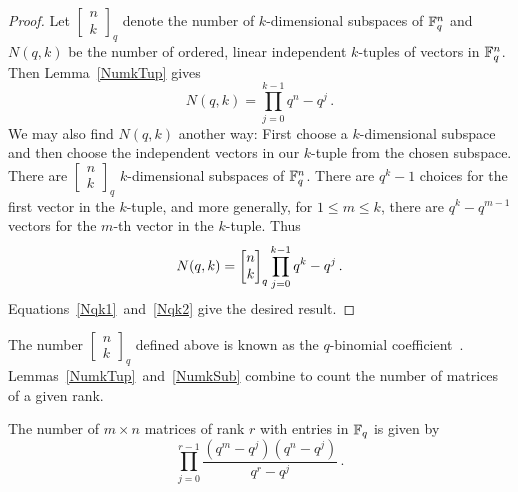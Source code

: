 \begin{proof}
  Let $\left[\begin{smallmatrix}n\\k\end{smallmatrix}\right]_q$ denote the number of $k$-dimensional subspaces of $\mathbb{F}_q^{n}$
  and $N(q,k)$ be the number of ordered, linear independent $k$-tuples of
  vectors in $\mathbb{F}_q^{n}$.  Then Lemma~\ref{NumkTup} gives
  \begin{equation}
    \label{Nqk1}
    N(q,k) = \prod_{j=0}^{k-1} q^n-q^j \, .
  \end{equation}
  We may also find $N(q,k)$ another way: First choose a $k$-dimensional
  subspace and then choose the independent vectors in our $k$-tuple from the
  chosen subspace.  There are
  $\left[\begin{smallmatrix}n\\k\end{smallmatrix}\right]_q$ $k$-dimensional
  subspaces of $\mathbb{F}_q^{n}$.  There are $q^k-1$ choices for the first vector in
  the $k$-tuple, and more generally, for $1 \leq m \leq k$, there are $q^k - q^{m-1}$ vectors for
  the $m$-th vector in the $k$-tuple.  Thus
  \begin{equation}\label{Nqk2}
    N(q,k) = \begin{bmatrix}{n}\\ {k}\end{bmatrix}_q\prod_{j=0}^{k-1} q^k - q^j \, .
  \end{equation}
  Equations~\eqref{Nqk1}~and~\eqref{Nqk2} give the desired result.
\end{proof}

The number $\left[\begin{smallmatrix}n\\k\end{smallmatrix}\right]_q$ defined
above is known as the $q$-binomial
coefficient~\cite{stanley2011enumerative}.  
Lemmas~\ref{NumkTup}~and~\ref{NumkSub} combine to count the number of matrices
of a given rank. %

\begin{lemma}\label{Num_mbyn_rankr}
The number of $m\times n$ matrices of rank $r$ with entries in $\mathbb{F}_q$ is given by
\begin{equation*}
      \prod_{j=0}^{r-1} \frac{(q^m-q^j) (q^n - q^j)}{q^r - q^j} \, .
\end{equation*}
\end{lemma}

